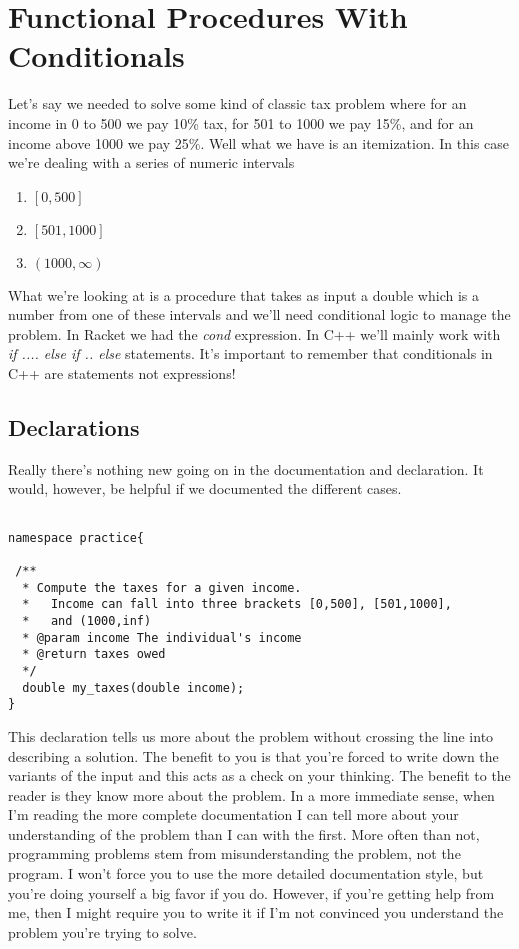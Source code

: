 \documentclass[]{tufte-handout}
\begin{document}
\section{Functional Procedures With Conditionals}

Let's say we needed to solve some kind of classic tax problem where for an income in 0 to 500 we pay 10\% tax, for 501 to 1000 we pay 15\%, and for an income above 1000 we pay 25\%. Well what we have is an itemization. In this case we're dealing with a series of numeric intervals
\begin{enumerate}
\item $[0,500]$
\item $[501,1000]$
\item $(1000,\infty)$
\end{enumerate}

What we're looking at is a procedure that takes as input a double which is a number from one of these intervals and we'll need conditional logic to manage the problem. In Racket we had the \textit{cond} expression. In C++ we'll mainly work with \textit{if .... else if .. else} statements.  It's important to remember that conditionals in C++ are statements not expressions!

\subsection{Declarations}

Really there's nothing new going on in the documentation and declaration. It would, however, be helpful if we documented the different cases. 
\begin{verbatim}

namespace practice{

 /** 
  * Compute the taxes for a given income.
  *   Income can fall into three brackets [0,500], [501,1000], 
  *   and (1000,inf)
  * @param income The individual's income 
  * @return taxes owed
  */
  double my_taxes(double income);
}

\end{verbatim}

This declaration tells us more about the problem without crossing the line into describing a solution. The benefit to you is that you're forced to write down the variants of the input and this acts as a check on your thinking. The benefit to the reader is they know more about the problem. In a more immediate sense, when I'm reading the more complete documentation I can tell more about your understanding of the problem than I can with the first. More often than not, programming problems stem from misunderstanding the problem, not the program. I won't force you to use the more detailed documentation style, but you're doing yourself a big favor if you do. However, if you're getting help from me, then I might require you to write it if I'm not convinced you understand the problem you're trying to solve. 
\end{document}
